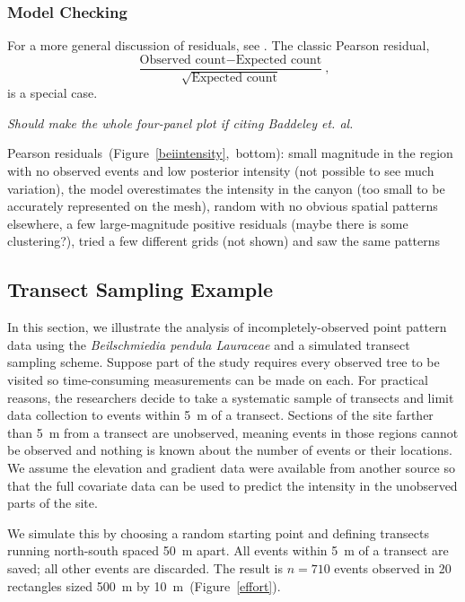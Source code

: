 \documentclass[]{interact}
\begin{document}
\subsubsection{Model Checking}

For a more general discussion of residuals, see \cite{baddeleyresiduals}. The
classic Pearson residual,
\begin{displaymath}
\frac{\text{Observed count} - \text{Expected count}}
{\sqrt{\text{Expected count}}},
\end{displaymath}
is a special case.

{\it Should make the whole four-panel plot if citing Baddeley et. al.}

Pearson residuals~(Figure~\ref{beiintensity},~bottom): small magnitude in the
region with no observed events and low posterior intensity (not possible to see
much variation), the model overestimates the intensity in the canyon (too small
to be accurately represented on the mesh), random with no obvious spatial
patterns elsewhere, a few large-magnitude positive residuals (maybe there is
some clustering?), tried a few different grids (not shown) and saw the same
patterns


\subsection{Transect Sampling Example}
\label{xsectanalysis}

In this section, we illustrate the analysis of incompletely-observed point
pattern data using the \emph{Beilschmiedia pendula Lauraceae} and a simulated
transect sampling scheme. Suppose part of the study requires every observed
tree to be visited so time-consuming measurements can be made on each. For
practical reasons, the researchers decide to take a systematic sample of
transects and limit data collection to events within 5~m of a transect.
Sections of the site farther than 5~m from a transect are unobserved, meaning
events in those regions cannot be observed and nothing is known about the
number of events or their locations. We assume the elevation and gradient data
were available from another source so that the full covariate data can be used
to predict the intensity in the unobserved parts of the site.

We simulate this by choosing a random starting point and defining transects
running north-south spaced 50~m apart. All events within 5~m of a transect are
saved; all other events are discarded. The result is \(n = 710\) events
observed in 20 rectangles sized 500~m by 10~m~(Figure~\ref{effort}).
\end{document}

